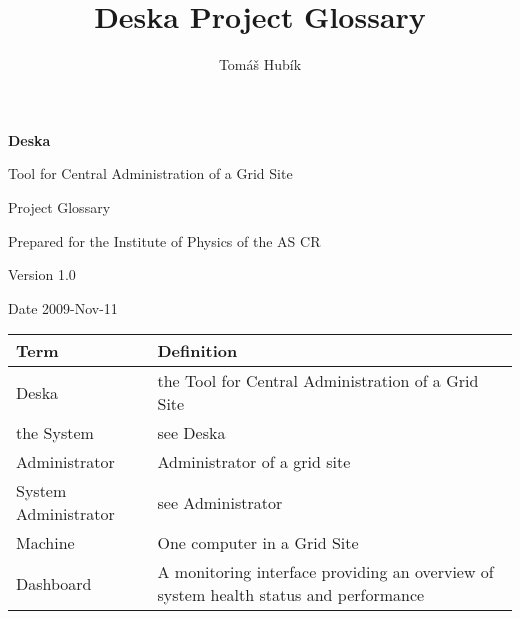 \documentclass[12pt]{article}
\author{Tomáš Hubík}
\title{Deska Project Glossary}
\begin{document}
{\Huge \textbf{Deska}}

\vspace{0.2in}

{\large Tool for Central Administration of a Grid Site}

\vspace{0.5in}

{\large Project Glossary}

\vspace{0.2in}

{\large Prepared for the Institute of Physics of the AS CR}

\vspace{0.2in}

{\large Version 1.0}

\vspace{0.2in}

{\large Date 2009-Nov-11}

\vspace{0.5in}


\begin{center}
	\begin{tabular}{| p{4cm} | p{11cm} |}
		\hline
		\textbf{Term} & \textbf{Definition}\\
		\hline
	Deska		& the Tool for Central Administration of a Grid Site\\
	the System	& see Deska\\
	Administrator	& Administrator of a grid site\\
	System Administrator & see Administrator\\
	Machine		& One computer in a Grid Site\\
	Dashboard	& A monitoring interface providing an overview of system health status and performance\\
		\hline
	\end{tabular}
	\label{tab:ProjectGlossary}
\end{center}
\end{document}
